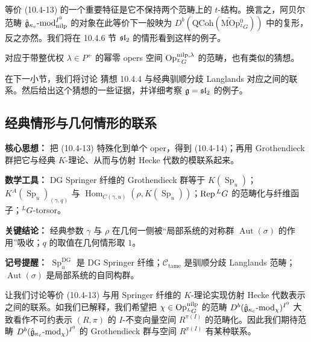 等价 (10.4-13) 的一个重要特征是它不保持两个范畴上的 $t$-结构。换言之，阿贝尔范畴 $\hat{\mathfrak{g}}_{\kappa_c}\text{-}\mathrm{mod}_{\mathrm{nilp}}^{I^0}$ 的对象在此等价下一般映为 $D^b(\mathrm{QCoh}(\widetilde{\mathrm{MOp}}{}^0_{{}^L G}))$ 中的复形，反之亦然。我们将在 10.4.6 节 $\mathfrak{sl}_2$ 的情形看到这样的例子。

对应于带整优权 $\lambda\in P^+$ 的幂零 opers 空间 $\operatorname{Op}^{\mathrm{nilp},\lambda}_{{}^L G}$ 的范畴，也有类似的猜想。

在下一小节，我们将讨论 猜想 10.4.4 与经典驯顺分歧 Langlands 对应之间的联系。然后给出这个猜想的一些证据，并详细考察 $\mathfrak{g}=\mathfrak{sl}_2$ 的例子。

\subsection{经典情形与几何情形的联系}

\begin{keypoints}
    \item \textbf{核心思想：} 把 (10.4-13) 特殊化到单个 oper，得到 (10.4-14)；再用 Grothendieck 群把它与经典 $K$-理论、从而与仿射 Hecke 代数的模联系起来。
    \item \textbf{数学工具：} DG Springer 纤维的 Grothendieck 群等于 $K(\operatorname{Sp}_u)$；$K^A(\operatorname{Sp}_u)_{(\gamma,q)}$ 与 $\operatorname{Hom}_{C(\gamma,u)}(\rho,K(\operatorname{Sp}_u))$；$\operatorname{Rep}{}^L G$ 的范畴化与纤维函子；$^L G$-torsor。
    \item \textbf{关键结论：} 经典参数 $\gamma$ 与 $\rho$ 在几何一侧被“局部系统的对称群 $\operatorname{Aut}(\sigma)$ 的作用”吸收；$q$ 的取值在几何情形取 $1$。
    \item \textbf{记号提醒：} $\operatorname{Sp}^{\mathrm{DG}}_u$ 是 DG Springer 纤维；$\mathcal{C}_{\mathrm{tame}}$ 是驯顺分歧 Langlands 范畴；$\operatorname{Aut}(\sigma)$ 是局部系统的自同构群。
\end{keypoints}

让我们讨论等价 (10.4-13) 与用 Springer 纤维的 $K$-理论实现仿射 Hecke 代数表示之间的联系。如我们已解释，我们希望把 $\chi\in\operatorname{Op}^{\mathrm{nilp}}_{{}^L G}$ 的范畴 $D^b(\hat{\mathfrak{g}}_{\kappa_c}\text{-}\mathrm{mod}_\chi)^{I^0}$ 大致看作不可约表示 $(R,\pi)$ 的 $I$-不变向量空间 $R^{\pi(I)}$ 的范畴化。因此我们期待范畴 $D^b(\hat{\mathfrak{g}}_{\kappa_c}\text{-}\mathrm{mod}_\chi)^{I^0}$ 的 Grothendieck 群与空间 $R^{\pi(I)}$ 有某种联系。

